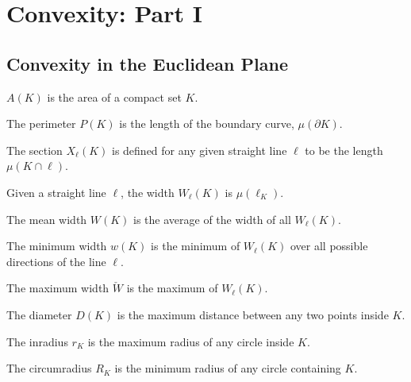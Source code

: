\documentclass[crop=false,class=article,oneside]{standalone}
\begin{document}
    \ifx\ifsub\undefined
        \section*{Convexity: Part I}
        \setcounter{section}{1}
    \fi
    \subsection{Convexity in the Euclidean Plane}
        \begin{definition}
        $A(K)$ is the area of a compact set $K$.
        \end{definition}
        \begin{definition}
        The perimeter $P(K)$ is the length of the boundary curve, $\mu(\partial K)$.
        \end{definition}
        \begin{definition}
        The section $X_{\ell}(K)$ is defined for any given straight line $\ell$ to be the length $\mu(K\cap \ell)$.
        \end{definition}
        \begin{definition}
        Given a straight line $\ell$, the width $W_{\ell}(K)$ is $\mu(\ell_{K})$.
        \end{definition}
        \begin{definition}
        The mean width $W(K)$ is the average of the width of all $W_{\ell}(K)$.
        \end{definition}
        \begin{definition}
        The minimum width $w(K)$ is the minimum of $W_{\ell}(K)$ over all possible directions of the line $\ell$.
        \end{definition}
        \begin{definition}
        The maximum width $\check{W}$ is the maximum of $W_{\ell}(K)$.
        \end{definition}
        \begin{definition}
        The diameter $D(K)$ is the maximum distance between any two points inside $K$.
        \end{definition}
        \begin{definition}
        The inradius $r_K$ is the maximum radius of any circle inside $K$.
        \end{definition}
        \begin{definition}
        The circumradius $R_K$ is the minimum radius of any circle containing $K$.
        \end{definition}
\end{document}
